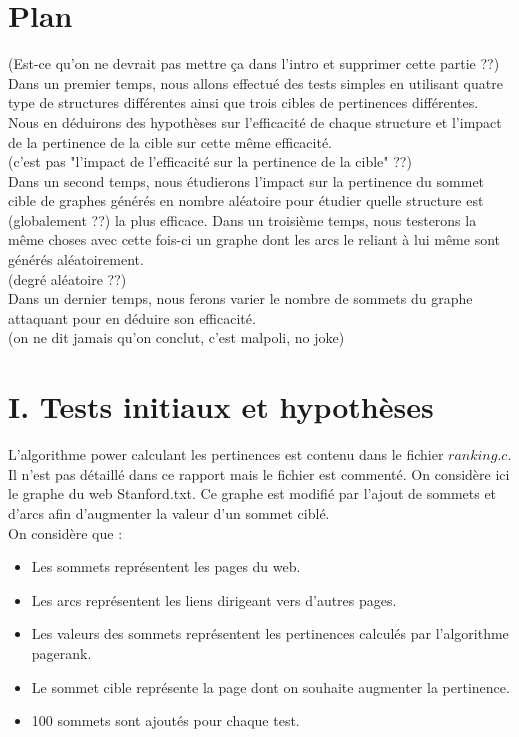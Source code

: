 \documentclass[a4paper,11pt]{article}
\begin{document}
\section{Plan}
	(Est-ce qu'on ne devrait pas mettre ça dans l'intro et supprimer cette partie ??)\\
	Dans un premier temps, nous allons effectué des tests simples en utilisant quatre type de structures différentes ainsi que trois cibles de pertinences différentes.
	Nous en déduirons des hypothèses sur l'efficacité de chaque structure et l'impact de la pertinence de la cible sur cette même efficacité.\\(c'est pas "l'impact de l'efficacité sur la pertinence de la cible" ??)\\
	Dans un second temps, nous étudierons l'impact sur la pertinence du sommet cible de graphes générés en nombre aléatoire pour étudier quelle structure est (globalement ??) la plus efficace.
	Dans un troisième temps, nous testerons la même choses avec cette fois-ci un graphe dont les arcs le reliant à lui même sont générés aléatoirement. \\(degré aléatoire ??)\\
	Dans un dernier temps, nous ferons varier le nombre de sommets du graphe attaquant pour en déduire son efficacité.\\(on ne dit jamais qu'on conclut, c'est malpoli, no joke)\\
	
\section{I.	Tests initiaux et hypothèses}
	L'algorithme power calculant les pertinences est contenu dans le fichier $ranking.c$. Il n'est pas détaillé dans ce rapport mais le fichier est commenté.
	On considère ici le graphe du web Stanford.txt. Ce graphe est modifié par l'ajout de sommets et d'arcs afin d'augmenter la valeur d'un sommet ciblé.\\
	On considère que :\\
	\begin{itemize}
		\item Les sommets représentent les pages du web.
		\item Les arcs représentent les liens dirigeant vers d'autres pages.
		\item Les valeurs des sommets représentent les pertinences calculés par l'algorithme pagerank.
		\item Le sommet cible représente la page dont on souhaite augmenter la pertinence.
		\item 100 sommets sont ajoutés pour chaque test.
	\end{itemize}
\end{document}
